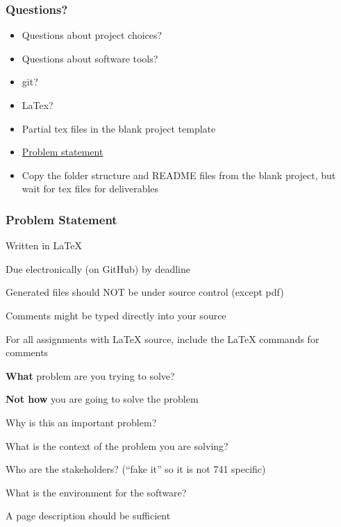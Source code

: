 \documentclass[t,12pt,numbers,fleqn]{beamer}
\begin{document}

\begin{frame}
\frametitle{Questions?}
\begin{itemize}
\item Questions about project choices?
\item Questions about software tools?
\bi
\item git?
\item LaTex?
\ei
\item Partial tex files in the blank project template
\item
  \href{https://gitlab.cas.mcmaster.ca/smiths/cas741/tree/master/BlankProjectTemplate/docs/ProblemStatement}{Problem
    statement}
\item Copy the folder structure and README files from the blank project, but
  wait for tex files for deliverables
\end{itemize}
\end{frame}


\begin{frame}
\frametitle{Problem Statement}
\bi
\item Written in LaTeX
\item Due electronically (on GitHub) by deadline
\item Generated files should NOT be under source control (except pdf)
\item Comments might be typed directly into your source
\item For all assignments with LaTeX source, include the LaTeX
  commands for comments
\item \textbf{What} problem are you trying to solve?
\item \textbf{Not how} you are going to solve the problem
\item Why is this an important problem?
\item What is the context of the problem you are solving? 
\bi
\item Who are the stakeholders? (``fake it'' so it is not 741 specific)
\item What is the environment for the software?
\ei
\item A page description should be sufficient
\ei
\end{frame}

\end{document}
